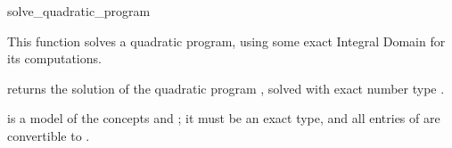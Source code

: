 \begin{ccRefFunction}{solve_quadratic_program}


This function solves a quadratic program, using some exact
Integral Domain  for its computations.   

{returns the solution of the quadratic program , solved
with exact number type .}

 is a model of the concepts  and
; it must
be an exact type, and all entries of  are convertible to 
.

\end{ccRefFunction}
